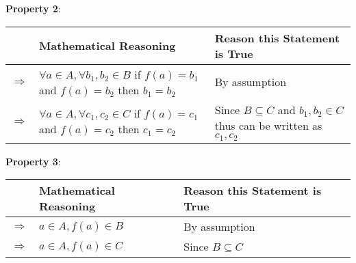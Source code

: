 \documentclass{article}
\begin{document}
\textbf{Property 2}:
\begin{flushleft}
    \begin{tabular}{|p{1.3cm}|p{5.4cm}|p{5.8cm}|}
         \hline
         & \textbf{Mathematical Reasoning} & \textbf{Reason this Statement is True} \\
        \hline
        $\Rightarrow$ & $\forall a\in A,\forall b_1,b_2\in B$ if $f(a)=b_1$ and $f(a)=b_2$ then $b_1=b_2$ & By assumption \\
        \hline
        $\Rightarrow$ & $\forall a\in A,\forall c_1,c_2\in C$ if $f(a)=c_1$ and $f(a)=c_2$ then $c_1=c_2$ & Since $B\subseteq C$ and $b_1,b_2\in C$ thus can be written as $c_1,c_2$\\
        \hline
    \end{tabular}
\end{flushleft}\vspace{10pt}


\textbf{Property 3}:
\begin{flushleft}
    \begin{tabular}{|p{1.3cm}|p{5.4cm}|p{5.8cm}|}
        \hline
         & \textbf{Mathematical Reasoning} & \textbf{Reason this Statement is True} \\
        \hline
        $\Rightarrow$ & $a\in A,f(a)\in B$ & By assumption \\
        \hline
        $\Rightarrow$ & $a\in A,f(a)\in C$ & Since $B\subseteq C$\\
        \hline
    \end{tabular}
\end{flushleft}
\end{document}
